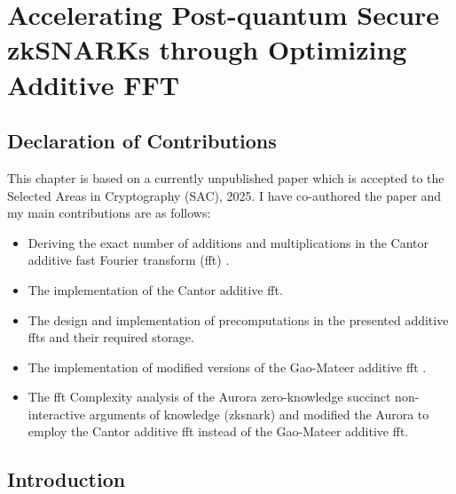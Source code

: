 \chapter{Accelerating Post-quantum Secure zkSNARKs through Optimizing Additive FFT}\label{ch:additive-fft}

\section*{Declaration of Contributions}
This chapter is based on a currently unpublished paper which is accepted to the Selected Areas in Cryptography (SAC), 2025. I have co-authored the paper and my main contributions are as follows:
\begin{itemize}
	\item Deriving the exact number of additions and multiplications in the Cantor additive fast Fourier transform (\gls{fft}) \cite{Cantor1989FFT}. 
	\item The \CC implementation of the Cantor additive \gls{fft}.
	\item The design and implementation of precomputations in the presented additive \gls{fft}s and their required storage.
	\item The \CC implementation of modified versions of the Gao-Mateer additive \gls{fft} \cite{Gao2010FFT}.
	\item  The \gls{fft} Complexity analysis of the Aurora zero-knowledge succinct non-interactive arguments of knowledge (\gls{zksnark}) and modified the Aurora  \CC  to employ  the Cantor additive \gls{fft} instead of  the Gao-Mateer additive \gls{fft}.
\end{itemize}

\section{Introduction}

